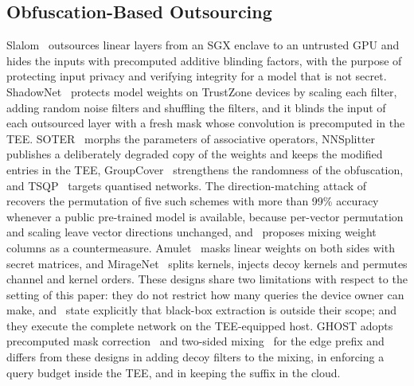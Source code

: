 \documentclass[lettersize,journal]{IEEEtran}
\begin{document}
\subsection{Obfuscation-Based Outsourcing}
Slalom~\cite{tramer2018slalom} outsources linear layers from an SGX enclave to an untrusted GPU and hides the inputs with precomputed additive blinding factors, with the purpose of protecting input privacy and verifying integrity for a model that is not secret. ShadowNet~\cite{sun2023shadownet} protects model weights on TrustZone devices by scaling each filter, adding random noise filters and shuffling the filters, and it blinds the input of each outsourced layer with a fresh mask whose convolution is precomputed in the TEE. SOTER~\cite{shen2022soter} morphs the parameters of associative operators, NNSplitter~\cite{zhou2023nnsplitter} publishes a deliberately degraded copy of the weights and keeps the modified entries in the TEE, GroupCover~\cite{zhang2024groupcover} strengthens the randomness of the obfuscation, and TSQP~\cite{sun2025tsqp} targets quantised networks. The direction-matching attack of~\cite{wang2025arrows} recovers the permutation of five such schemes with more than 99\% accuracy whenever a public pre-trained model is available, because per-vector permutation and scaling leave vector directions unchanged, and~\cite{wang2025arrows} proposes mixing weight columns as a countermeasure. Amulet~\cite{mao2025amulet} masks linear weights on both sides with secret matrices, and MirageNet~\cite{zheng2026miragenet} splits kernels, injects decoy kernels and permutes channel and kernel orders. These designs share two limitations with respect to the setting of this paper: they do not restrict how many queries the device owner can make, and~\cite{sun2023shadownet,mao2025amulet} state explicitly that black-box extraction is outside their scope; and they execute the complete network on the TEE-equipped host. GHOST adopts precomputed mask correction~\cite{tramer2018slalom,sun2023shadownet} and two-sided mixing~\cite{mao2025amulet} for the edge prefix and differs from these designs in adding decoy filters to the mixing, in enforcing a query budget inside the TEE, and in keeping the suffix in the cloud.
\end{document}
